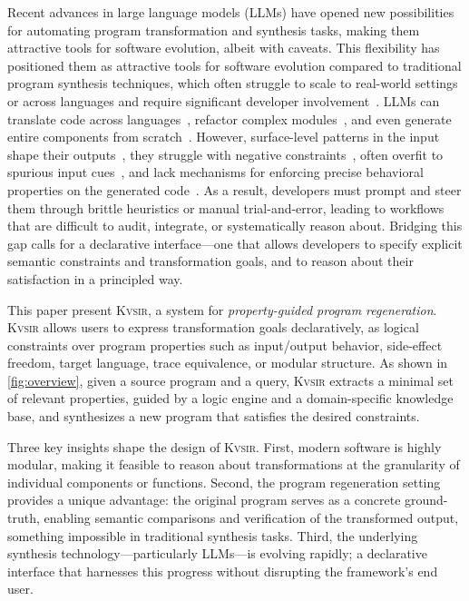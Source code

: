 \documentclass[nonacm,sigplan,review]{acmart}
\newcommand{\sys}{{\scshape Kv{\textalpha}sir}\xspace}
\begin{document}
Recent advances in large language models (LLMs) have opened new possibilities for automating program transformation and synthesis tasks, making them attractive tools for software evolution, albeit with caveats.
This flexibility has positioned them as attractive tools for software evolution
compared to traditional program synthesis techniques, which often struggle
to scale to real-world settings or across languages and require significant developer involvement~\cite{reynolds2019syguscomp,leino2016dafny,wu2023programming,dynamoth2016,cambronero2019active}.
LLMs can translate code across languages~\cite{ou2025enhancingllmbasedcodetranslation},
refactor complex modules~\cite{ziftci2025migrating},
and even generate entire components from scratch~\cite{huynh2025largelanguagemodelscode}.
However, surface-level patterns in the input shape their outputs~\cite{yang2025evaluatinggeneralizationcapabilitieslarge},
they struggle with negative constraints~\cite{hwang2024thinkpinkelephant,jiang2024llmsdreamelephantswhen},
often overfit to spurious input cues~\cite{xu2023llmfoolitselfpromptbased, wu2023deceptpromptexploitingllmdrivencode},
and lack mechanisms for enforcing precise behavioral properties on the generated code~\cite{roh2025breakthechainreasoningfailuresllms}.
As a result, developers must prompt and steer them through brittle heuristics or manual trial-and-error, leading to workflows that are difficult to audit, integrate, or systematically reason about.
Bridging this gap calls for a declarative interface---one that allows developers to specify explicit semantic constraints and transformation goals, and to reason about their satisfaction in a principled way.

This paper present \sys, a system for \emph{property-guided program regeneration}.
\sys allows users
to express transformation goals declaratively, as logical constraints over
program properties such as input/output behavior, side-effect freedom, target
language, trace equivalence, or modular structure.
As shown in \cref{fig:overview}, given a source program and
a query, \sys extracts a minimal set of relevant properties, guided by a
logic engine and a domain-specific knowledge base, and synthesizes a new
program that satisfies the desired constraints.

Three key insights shape the design of \sys.
First, modern software is highly modular, making it feasible to reason about transformations at the granularity of individual components or functions.
Second, the program regeneration setting provides a unique advantage: the original program serves as a concrete ground-truth, enabling semantic comparisons and verification of the transformed output, something impossible in traditional synthesis tasks.
Third, the underlying synthesis technology---particularly LLMs---is evolving rapidly; a declarative interface that harnesses this progress without disrupting the framework's end user.
\end{document}
